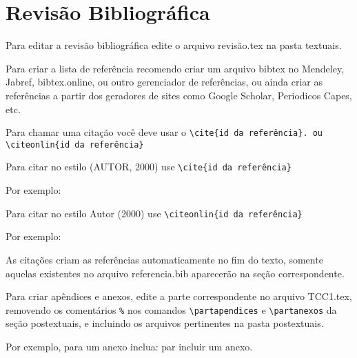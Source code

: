 \chapter{Revisão Bibliográfica}
Para editar a revisão bibliográfica edite o arquivo revisão.tex na pasta textuais. 
\par
Para criar a lista de referência recomendo criar um arquivo bibtex no Mendeley, Jabref, bibtex.online, ou outro gerenciador de referências, ou ainda criar as referências a partir dos geradores de sites como Google Scholar, Periodicos Capes, etc. 
\par
Para chamar uma citação você deve usar o \verb+\cite{id da referência}. ou \citeonlin{id da referência}+
\par
Para citar no estilo (AUTOR, 2000) use \verb+\cite{id da referência}+
\par
Por exemplo: \cite{Abuidris2019}
\par
Para citar no estilo Autor (2000) use \verb+\citeonlin{id da referência}+
\par
Por exemplo: 
\par
As citações criam as referências automaticamente no fim do texto, somente aquelas existentes no arquivo referencia.bib aparecerão na seção correspondente.

Para criar apêndices e anexos, edite a parte correspondente no arquivo TCC1.tex, removendo os comentários \verb+%+ nos comandos \verb+\partapendices+ e \verb+\partanexos+ da seção postextuais, e incluindo os arquivos pertinentes na pasta postextuais.

Por exemplo, para um anexo inclua: \verb++ par incluir um anexo. 